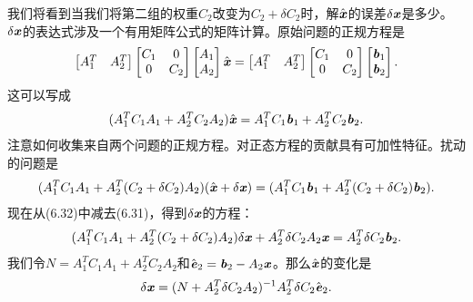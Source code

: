 我们将看到当我们将第二组的权重$C_{2}$改变为$ C_{2}+\delta C_{2}$时，解$\hat{\textbf{\textit{x}}}$的误差$ \delta \textbf{\textit{x}} $是多少。$ \delta \textbf{\textit{x}} $的表达式涉及一个有用矩阵公式的矩阵计算。原始问题的正规方程是
\begin{align*}
\begin{bmatrix}
A^{T}_{1} &	A^{T}_{2}
\end{bmatrix}
\begin{bmatrix}
C_{1} &	0 \\
0     &	C_{2}
\end{bmatrix}
\begin{bmatrix}
A_{1} \\
A_{2}
\end{bmatrix}  \hat{\textbf{\textit{x}}} = 
\begin{bmatrix}
A^{T}_{1} &	A^{T}_{2}
\end{bmatrix}
\begin{bmatrix}
C_{1} &	0 \\
0     &	C_{2}
\end{bmatrix}
\begin{bmatrix}
\textbf{\textit{b}}_{1} \\
\textbf{\textit{b}}_{2}
\end{bmatrix}.
\end{align*}
这可以写成
\begin{align}
(A^{T}_{1}C_{1}A_{1}+A^{T}_{2}C_{2}A_{2})\hat{\textbf{\textit{x}}}=A^{T}_{1}C_{1}\textbf{\textit{b}}_{1}+A^{T}_{2}C_{2}\textbf{\textit{b}}_{2}.
\end{align}
注意如何收集来自两个问题的正规方程。对正态方程的贡献具有可加性特征。扰动的问题是
\begin{align}
(A^{T}_{1}C_{1}A_{1}+A^{T}_{2}(C_{2}+\delta C_{2} )A_{2})(\hat{\textbf{\textit{x}}}+\delta \textbf{\textit{x}} )=(A^{T}_{1}C_{1}\textbf{\textit{b}}_{1}+A^{T}_{2}(C_{2}+\delta C_{2} )\textbf{\textit{b}}_{2}).
\end{align}
现在从(6.32)中减去(6.31)，得到$ \delta \textbf{\textit{x}} $的方程：
\begin{align}
(A^{T}_{1}C_{1}A_{1}+A^{T}_{2}(C_{2}+\delta C_{2} )A_{2})\delta \textbf{\textit{x}} + A^{T}_{2}\delta C_{2}A_{2}\textbf{\textit{x}}=
A^{T}_{2}\delta C_{2}\textbf{\textit{b}}_{2}.
\end{align}
我们令$ N= A^{T}_{1}C_{1}A_{1} + A^{T}_{2}C_{2}A_{2}$和$ \hat{\textbf{\textit{e}}}_{2} = \textbf{\textit{b}}_{2} - A_{2}\textbf{\textit{x}}  $。那么$\hat{\textbf{\textit{x}}}$的变化是
\begin{align}
\delta \textbf{\textit{x}} = ( N + A^{T}_{2}\delta C_{2}A_{2})^{-1}
A^{T}_{2}\delta C_{2} \hat{\textbf{\textit{e}}}_{2}.
\end{align}
